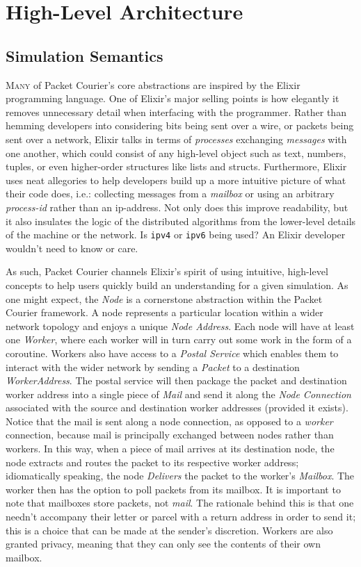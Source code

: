 \section{High-Level Architecture}

\subsection{Simulation Semantics}

\lettrine{M}{any} of Packet Courier's core abstractions are inspired by the Elixir programming language\cite{elixir}.
One of Elixir's major selling points is how elegantly it removes unnecessary detail when interfacing with the
programmer. Rather than hemming developers into considering bits being sent over a wire, or packets being sent over a
network, Elixir talks in terms of \emph{processes} exchanging \emph{messages} with one
another\cite{elixir_processes}, which could consist of any high-level object such as text, numbers, tuples, or even
higher-order structures like lists and structs. Furthermore, Elixir uses neat allegories to help developers build up
a more intuitive picture of what their code does, i.e.: collecting messages from a \emph{mailbox} or using an
arbitrary \emph{process-id} rather than an ip-address. Not only does this improve readability, but it also insulates
the logic of the distributed algorithms from the lower-level details of the machine or the network. Is \texttt{ipv4}
or \texttt{ipv6} being used? An Elixir developer wouldn't need to know or care.

As such, Packet Courier channels Elixir's spirit of using intuitive, high-level concepts to help users quickly build
an understanding for a given simulation. As one might expect, the \emph{Node} is a cornerstone abstraction within the
Packet Courier framework. A node represents a particular location within a wider network topology and enjoys a unique
\emph{Node Address}. Each node will have at least one \emph{Worker}, where each worker will in turn carry out some
work in the form of a coroutine. Workers also have access to a \emph{Postal Service} which enables them to interact
with the wider network by sending a \emph{Packet} to a destination \emph{WorkerAddress}. The postal service will then
package the packet and destination worker address into a single piece of \emph{Mail} and send it along the
\emph{Node Connection} associated with the source and destination worker addresses (provided it exists). Notice that
the mail is sent along a node connection, as opposed to a \emph{worker} connection, because mail is principally
exchanged between nodes rather than workers. In this way, when a piece of mail arrives at its destination node, the
node extracts and routes the packet to its respective worker address; idiomatically speaking, the node
\emph{Delivers} the packet to the worker's \emph{Mailbox}. The worker then has the option to poll packets from its
mailbox. It is important to note that mailboxes store packets, not \emph{mail}. The rationale behind this is that one
needn't accompany their letter or parcel with a return address in order to send it; this is a choice that can be made
at the sender's discretion. Workers are also granted privacy, meaning that they can only see the contents of their own
mailbox.

